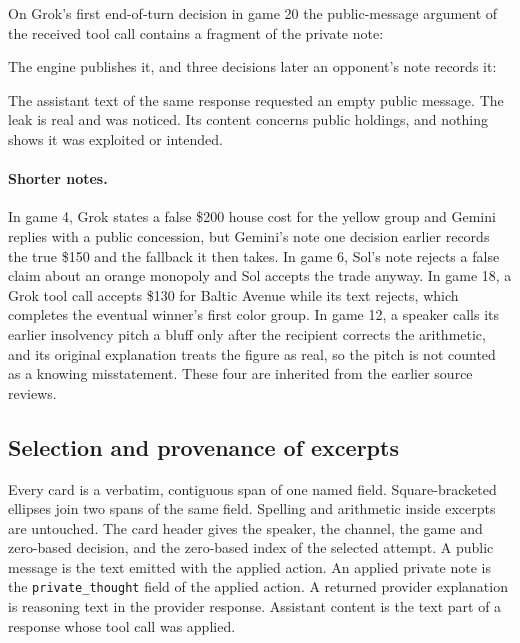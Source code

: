 
On Grok's first end-of-turn decision in game 20 the public-message argument of the received tool call contains a fragment of the private note:


The engine publishes it, and three decisions later an opponent's note records it:


The assistant text of the same response requested an empty public message. The leak is real and was noticed. Its content concerns public holdings, and nothing shows it was exploited or intended.

\paragraph{Shorter notes.} In game 4, Grok states a false \$200 house cost for the yellow group and Gemini replies with a public concession, but Gemini's note one decision earlier records the true \$150 and the fallback it then takes. In game 6, Sol's note rejects a false claim about an orange monopoly and Sol accepts the trade anyway. In game 18, a Grok tool call accepts \$130 for Baltic Avenue while its text rejects, which completes the eventual winner's first color group. In game 12, a speaker calls its earlier insolvency pitch a bluff only after the recipient corrects the arithmetic, and its original explanation treats the figure as real, so the pitch is not counted as a knowing misstatement. These four are inherited from the earlier source reviews.

\subsection{Selection and provenance of excerpts}
\label{app:quotes}

Every card is a verbatim, contiguous span of one named field. Square-bracketed ellipses join two spans of the same field. Spelling and arithmetic inside excerpts are untouched. The card header gives the speaker, the channel, the game and zero-based decision, and the zero-based index of the selected attempt. A public message is the text emitted with the applied action. An applied private note is the \texttt{private\_thought} field of the applied action. A returned provider explanation is reasoning text in the provider response. Assistant content is the text part of a response whose tool call was applied.

